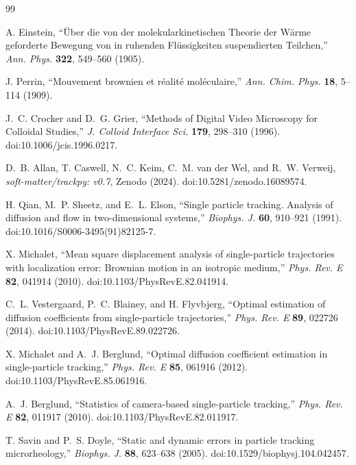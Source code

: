 \documentclass[11pt]{article}
\begin{document}
\FloatBarrier
\begin{thebibliography}{99}

 A. Einstein, ``\"Uber die von der molekularkinetischen
Theorie der W\"arme geforderte Bewegung von in ruhenden Fl\"ussigkeiten
suspendierten Teilchen,'' \textit{Ann. Phys.} \textbf{322}, 549--560 (1905).

 J. Perrin, ``Mouvement brownien et r\'ealit\'e
mol\'eculaire,'' \textit{Ann. Chim. Phys.} \textbf{18}, 5--114 (1909).

 J.~C. Crocker and D.~G. Grier, ``Methods of Digital Video
Microscopy for Colloidal Studies,'' \textit{J. Colloid Interface Sci.}
\textbf{179}, 298--310 (1996). doi:10.1006/jcis.1996.0217.

 D.~B. Allan, T. Caswell, N.~C. Keim, C.~M. van der Wel, and
R.~W. Verweij, \textit{soft-matter/trackpy: v0.7}, Zenodo (2024).
doi:10.5281/zenodo.16089574.

 H. Qian, M.~P. Sheetz, and E.~L. Elson, ``Single particle tracking.
Analysis of diffusion and flow in two-dimensional systems,'' \textit{Biophys. J.}
\textbf{60}, 910--921 (1991). doi:10.1016/S0006-3495(91)82125-7.

 X. Michalet, ``Mean square displacement analysis of
single-particle trajectories with localization error: Brownian motion in an
isotropic medium,'' \textit{Phys. Rev. E} \textbf{82}, 041914 (2010).
doi:10.1103/PhysRevE.82.041914.

 C.~L. Vestergaard, P.~C. Blainey, and H. Flyvbjerg, ``Optimal
estimation of diffusion coefficients from single-particle trajectories,''
\textit{Phys. Rev. E} \textbf{89}, 022726 (2014).
doi:10.1103/PhysRevE.89.022726.

 X. Michalet and A.~J. Berglund, ``Optimal diffusion
coefficient estimation in single-particle tracking,'' \textit{Phys. Rev. E}
\textbf{85}, 061916 (2012). doi:10.1103/PhysRevE.85.061916.

 A.~J. Berglund, ``Statistics of camera-based single-particle
tracking,'' \textit{Phys. Rev. E} \textbf{82}, 011917 (2010).
doi:10.1103/PhysRevE.82.011917.

 T. Savin and P.~S. Doyle, ``Static and dynamic errors in
particle tracking microrheology,'' \textit{Biophys. J.} \textbf{88}, 623--638
(2005). doi:10.1529/biophysj.104.042457.


\end{thebibliography}
\end{document}
